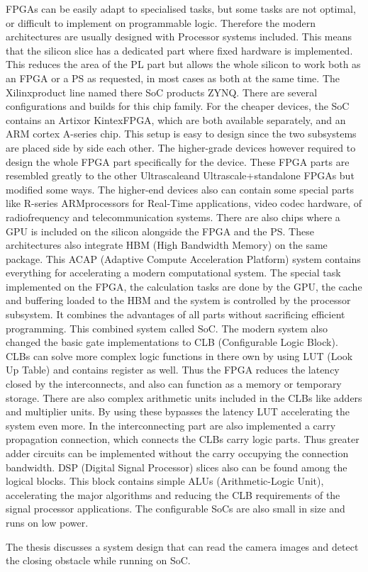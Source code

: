 FPGAs can be easily adapt to specialised tasks, but some tasks are not optimal, or difficult to implement on programmable logic.
Therefore the modern architectures are usually designed with Processor systems included.
This means that the silicon slice has a dedicated part where fixed hardware is implemented.
This reduces the area of the PL part but allows the whole silicon to work both as an FPGA or a PS as requested, in most cases as both at the same time.
The Xilinx\texttrademark product line named there SoC products ZYNQ.
There are several configurations and builds for this chip family.
For the cheaper devices, the SoC contains an Artix\texttrademark or Kintex\texttrademark FPGA, which are both available separately, and an ARM cortex A-series chip.
This setup is easy to design since the two subsystems are placed side by side each other.
The higher-grade devices however required to design the whole FPGA part specifically for the device.
These FPGA parts are resembled greatly to the other Ultrascale\texttrademark and Ultrascale+\texttrademark standalone FPGAs but modified some ways.
The higher-end devices also can contain some special parts like R-series ARM\texttrademark processors for Real-Time applications, video codec hardware, of radiofrequency and telecommunication systems.
There are also chips where a GPU is included on the silicon alongside the FPGA and the PS.
These architectures also integrate HBM (High Bandwidth Memory) on the same package.
This ACAP (Adaptive Compute Acceleration Platform) system contains everything for accelerating a modern computational system.
The special task implemented on the FPGA, the calculation tasks are done by the GPU, the cache and buffering loaded to the HBM and the system is controlled by the processor subsystem.
It combines the advantages of all parts without sacrificing efficient programming. 
This combined system called SoC.
The modern system also changed the basic gate implementations to CLB (Configurable Logic Block).
CLBs can solve more complex logic functions in there own by using LUT (Look Up Table) and contains register as well.
Thus the FPGA reduces the latency closed by the interconnects, and also can function as a memory or temporary storage.
There are also complex arithmetic units included in the CLBs like adders and multiplier units.
By using these bypasses the latency LUT accelerating the system even more.
In the interconnecting part are also implemented a carry propagation connection, which connects the CLBs carry logic parts.
Thus greater adder circuits can be implemented without the carry occupying the connection bandwidth.
DSP (Digital Signal Processor) slices also can be found among the logical blocks.
This block contains simple ALUs (Arithmetic-Logic Unit), accelerating the major algorithms and reducing the CLB requirements of the signal processor applications.
The configurable SoCs are also small in size and runs on low power.

The thesis discusses a system design that can read the camera images and detect the closing obstacle while running on SoC.

\clearpage